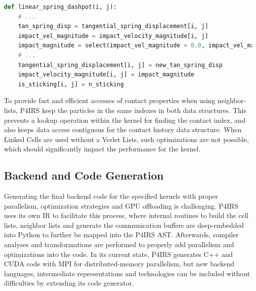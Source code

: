 \documentclass[preprint,12pt]{elsarticle}
\begin{document}
\begin{lstlisting}[language=Python,
		   label={lst:contactprops2},
		   caption={Usage example for contact properties.}]
def linear_spring_dashpot(i, j):
    # ...
    tan_spring_disp = tangential_spring_displacement[i, j]
    impact_vel_magnitude = impact_velocity_magnitude[i, j]
    impact_magnitude = select(impact_vel_magnitude > 0.0, impact_vel_magnitude, length(rel_vel))
    # ...
    tangential_spring_displacement[i, j] = new_tan_spring_disp
    impact_velocity_magnitude[i, j] = impact_magnitude
    is_sticking[i, j] = n_sticking
\end{lstlisting}

To provide fast and efficient accesses of contact properties when using neighbor-lists, P4IRS keep the particles in the same indexes in both data structures.
This prevents a lookup operation within the kernel for finding the contact index, and also keeps data access contiguous for the contact history data structure.
When Linked Cells are used without a Verlet Lists, such optimizations are not possible, which should significantly impact the performance for the kernel.


\subsection{Backend and Code Generation}
\label{sec:backend}

Generating the final backend code for the specified kernels with proper parallelism, optimization strategies and GPU offloading is challenging.
P4IRS uses its own \ac{IR} to facilitate this process, where internal routines to build the cell lists, neighbor lists and generate the communication buffers are deep-embedded into Python to further be mapped into the P4IRS \ac{AST}.
Afterwards, compiler analyses and transformations are performed to properly add parallelism and optimizations into the code.
In its current state, P4IRS generates C++ and CUDA code with MPI for distributed-memory parallelism, but new backend languages, intermediate representations and technologies can be included without difficulties by extending its code generator.
\end{document}
